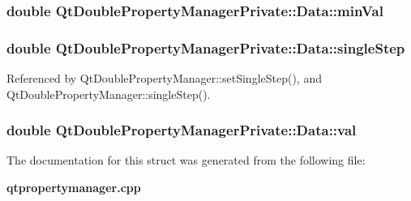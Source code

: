 \subsubsection[{min\+Val}]{\setlength{\rightskip}{0pt plus 5cm}double Qt\+Double\+Property\+Manager\+Private\+::\+Data\+::min\+Val}\label{structQtDoublePropertyManagerPrivate_1_1Data_a4ee6f4e0ea966e2ba7eac0ddc95e3a88}
\subsubsection[{single\+Step}]{\setlength{\rightskip}{0pt plus 5cm}double Qt\+Double\+Property\+Manager\+Private\+::\+Data\+::single\+Step}\label{structQtDoublePropertyManagerPrivate_1_1Data_a9593baa2913e51470d651b2700597ab8}


Referenced by Qt\+Double\+Property\+Manager\+::set\+Single\+Step(), and Qt\+Double\+Property\+Manager\+::single\+Step().

\subsubsection[{val}]{\setlength{\rightskip}{0pt plus 5cm}double Qt\+Double\+Property\+Manager\+Private\+::\+Data\+::val}\label{structQtDoublePropertyManagerPrivate_1_1Data_a74431b47c630c8dbfca8baa9371bffd9}


The documentation for this struct was generated from the following file\+:\begin{DoxyCompactItemize}
\item 
{\bf qtpropertymanager.\+cpp}\end{DoxyCompactItemize}
